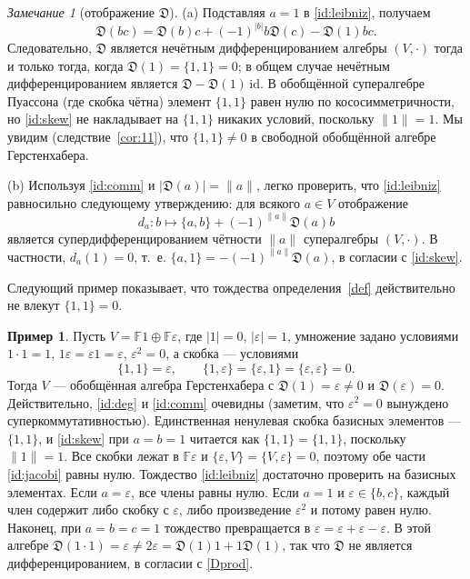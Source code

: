 \documentclass[11pt,reqno]{amsart}
\newcommand{\F}{\mathbb F}
\newcommand{\D}{\mathfrak D}
\newcommand{\rp}[1]{\|#1\|}
\theoremstyle{plain}
\theoremstyle{definition}
\newtheorem{example}{Пример}
\theoremstyle{remark}
\newtheorem{remark}[theorem]{Замечание}
\begin{document}
\begin{remark}[отображение $\D$]\label{rem:D}
(a) Подставляя $a=1$ в \eqref{id:leibniz}, получаем
\begin{equation}\label{Dprod}
\D(bc)=\D(b)c+(-1)^{|b|}b\D(c)-\D(1)bc .
\end{equation}
Следовательно, $\D$ является нечётным дифференцированием алгебры $(V,\cdot)$ тогда и только тогда, когда $\D(1)=\{1,1\}=0$; в общем случае нечётным дифференцированием является $\D-\D(1)\,\mathrm{id}$.
В обобщённой супералгебре Пуассона (где скобка чётна) элемент $\{1,1\}$ равен нулю по кососимметричности, но \eqref{id:skew} не накладывает на $\{1,1\}$ никаких условий, поскольку $\rp 1=1$.
Мы увидим (следствие~\ref{cor:11}), что $\{1,1\}\neq0$ в свободной обобщённой алгебре Герстенхабера.

(b) Используя \eqref{id:comm} и $|\D(a)|=\rp a$, легко проверить, что \eqref{id:leibniz} равносильно следующему утверждению: для всякого $a\in V$ отображение
$$
d_a\colon b\mapsto \{a,b\}+(-1)^{\rp a}\D(a)b
$$
является супердифференцированием чётности $\rp a$ супералгебры $(V,\cdot)$.
В частности, $d_a(1)=0$, т.~е. $\{a,1\}=-(-1)^{\rp a}\D(a)$, в согласии с \eqref{id:skew}.
\end{remark}

Следующий пример показывает, что тождества определения~\ref{def} действительно не влекут $\{1,1\}=0$.

\begin{example}\label{ex:dim2}
Пусть $V=\F1\oplus\F\varepsilon$, где $|1|=0$, $|\varepsilon|=1$, умножение задано условиями $1\cdot1=1$, $1\varepsilon=\varepsilon1=\varepsilon$, $\varepsilon^2=0$, а скобка --- условиями
$$
\{1,1\}=\varepsilon,\qquad \{1,\varepsilon\}=\{\varepsilon,1\}=\{\varepsilon,\varepsilon\}=0 .
$$
Тогда $V$ --- обобщённая алгебра Герстенхабера с $\D(1)=\varepsilon\ne0$ и $\D(\varepsilon)=0$.
Действительно, \eqref{id:deg} и \eqref{id:comm} очевидны (заметим, что $\varepsilon^2=0$ вынуждено суперкоммутативностью).
Единственная ненулевая скобка базисных элементов --- $\{1,1\}$, и \eqref{id:skew} при $a=b=1$ читается как $\{1,1\}=\{1,1\}$, поскольку $\rp1=1$.
Все скобки лежат в $\F\varepsilon$ и $\{\varepsilon,V\}=\{V,\varepsilon\}=0$, поэтому обе части \eqref{id:jacobi} равны нулю.
Тождество \eqref{id:leibniz} достаточно проверить на базисных элементах.
Если $a=\varepsilon$, все члены равны нулю.
Если $a=1$ и $\varepsilon\in\{b,c\}$, каждый член содержит либо скобку с $\varepsilon$, либо произведение $\varepsilon^2$ и потому равен нулю.
Наконец, при $a=b=c=1$ тождество превращается в $\varepsilon=\varepsilon+\varepsilon-\varepsilon$.
В этой алгебре $\D(1\cdot1)=\varepsilon\ne2\varepsilon=\D(1)1+1\D(1)$, так что $\D$ не является дифференцированием, в согласии с \eqref{Dprod}.
\end{example}
\end{document}
